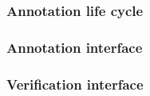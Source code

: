 \documentclass{beamer}
\begin{document}
\begin{frame}
\frametitle{Annotation life cycle}
\begin{figure}
\end{figure}
\end{frame}


\begin{frame}
\frametitle{Annotation interface}
\begin{figure}
\end{figure}
\end{frame}

\begin{frame}
\frametitle{Verification interface}
\begin{figure}
\end{figure}
\end{frame}
\end{document}
